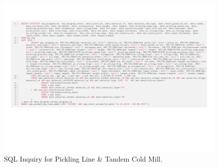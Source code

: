\begin{landscape}
	\begin{figure}[ht]
		\centering
		\includegraphics[width=1.4\textwidth]{../database_inquiries/PLTCM.pdf}
		\caption{SQL Inquiry for Pickling Line \& Tandem Cold Mill.}
		\label{figure-supplements-PLTCM-SQL}
	\end{figure}
\end{landscape}